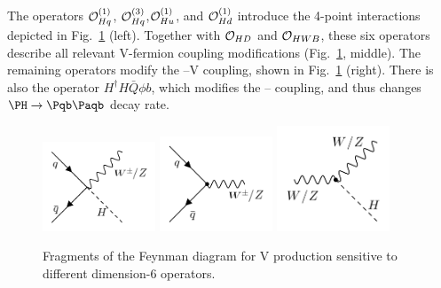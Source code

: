 \documentclass[a4paper,11pt]{article}
\newcommand{\Pb}{{{\Pqb}}\xspace}
\newcommand{\PAb}{{{{\Paqb}}}\xspace}
\renewcommand{\PV}{{{{V}}}\xspace}
\newcommand{\VH}{{{\PV}{\PH}}\xspace}
\begin{document}
The operators ${\cal O}^{(1)}_{Hq}$, ${\cal O}^{(3)}_{Hq}$,${\cal O}^{(1)}_{Hu}$, and ${\cal O}^{(1)}_{Hd}$ introduce the 4-point interactions depicted in Fig.~\ref{fig:Feynman_digarams} (left). 
Together with ${\cal O}_{HD}$ and ${\cal O}_{HWB}$, these six operators describe all relevant \PV-fermion coupling modifications (Fig.~\ref{fig:Feynman_digarams}, middle). 
The remaining operators modify the \PH--\PV coupling, shown in Fig.~\ref{fig:Feynman_digarams} (right). 
There is also the operator $H^\dagger H \bar{Q}\phi b$, which modifies the \PH--\Pb coupling, and thus changes $\PH \to \Pb \PAb$ decay rate. %
\begin{figure}[hbtp]
\begin{center}
\includegraphics[width=0.3\textwidth]{Figures/Feynman_diagrams/ffVh.png}
\includegraphics[width=0.3\textwidth]{Figures/Feynman_diagrams/Vff.png}
\includegraphics[width=0.3\textwidth]{Figures/Feynman_diagrams/hVV.png}
\end{center}
\caption{
Fragments of the Feynman diagram for \VH production sensitive to different dimension-6 operators.
}
\label{fig:Feynman_digarams}
\end{figure}

\end{document}
